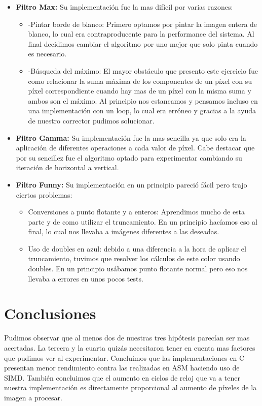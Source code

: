 \documentclass[a4paper]{article}
\begin{document}
\begin{itemize}
    \item \textbf{Filtro Max:} Su implementación fue la mas difícil por varias razones: 
    \begin{itemize}
        \item -Pintar borde de blanco: Primero optamos por pintar la imagen entera de blanco, lo cual era contraproducente para la performance del sistema. Al final decidimos cambiar el algoritmo por uno mejor que solo pinta cuando es necesario.
        \item -Búsqueda del máximo: El mayor obstáculo que presento este ejercicio fue como relacionar la suma máxima de los componentes de un píxel con su píxel correspondiente cuando hay mas de un píxel con la misma suma y ambos son el máximo. Al principio nos estancamos y pensamos incluso en una implementación con un loop, lo cual era erróneo y gracias a la ayuda de nuestro corrector pudimos solucionar.
    \end{itemize}
    \item \textbf{Filtro Gamma:} Su implementación fue la mas sencilla ya que solo era la aplicación de diferentes operaciones a cada valor de píxel. Cabe destacar que por su sencillez fue el algoritmo optado para experimentar cambiando su iteración de horizontal a vertical. %
    \item \textbf{Filtro Funny:} Su implementación en un principio pareció fácil pero trajo ciertos problemas: 
    \begin{itemize}
        \item Conversiones a punto flotante y a enteros: Aprendimos mucho de esta parte y de como utilizar el truncamiento. En un principio hacíamos eso al final, lo cual nos llevaba a imágenes diferentes a las deseadas.
        \item Uso de doubles en azul: debido a una diferencia a la hora de aplicar el truncamiento, tuvimos que resolver los cálculos de este color usando doubles. En un principio usábamos punto flotante normal pero eso nos llevaba a errores en unos pocos tests.
    \end{itemize}
    
\end{itemize}
\section{Conclusiones}

Pudimos observar que al menos dos de nuestras tres hipótesis parecían ser mas acertadas. La tercera y la cuarta quizás necesitaron tener en cuenta mas factores que pudimos ver al experimentar. 
Concluimos que las implementaciones en C presentan menor rendimiento contra las realizadas en ASM haciendo uso de SIMD. 
También concluimos que el aumento en ciclos de reloj que va a tener nuestra implementación es directamente proporcional al aumento de píxeles de la imagen a procesar.
\end{document}
